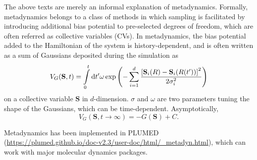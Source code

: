 
The above texts are merely an informal explanation of metadynamics. Formally, metadynamics belongs to a class of methods in which sampling is facilitated by introducing additional bias potential to pre-selected degrees of freedom, which are often referred as collective variables (CVs). In metadynamics, the bias potential added to the Hamiltonian of the system is history-dependent, and is often written as a sum of Gaussians deposited during the simulation as
\begin{equation}
   V_G(\mathbf{S},t) = \int\limits_0^t\mathop{}\!\mathrm{d} t^\prime \omega\exp{\left(-\sum\limits_{i=1}^{d}\frac{\left[\mathbf{S}_i(R)-\mathbf{S}_i(R(t^\prime))\right]^2}{2\sigma_i^2}\right)}
\end{equation}
on a collective variable $\mathbf{S}$ in $d$-dimension. $\sigma$ and $\omega$ are two parameters tuning the shape of the Gaussians, which can be time-dependent. Asymptotically, 
\begin{equation}
   V_G(\mathbf{S},t\rightarrow \infty) = -G(\mathbf{S})+C.
\end{equation}

Metadynamics has been implemented in PLUMED (\url{https://plumed.github.io/doc-v2.3/user-doc/html/_metadyn.html}), which can work with major molecular dynamics packages.